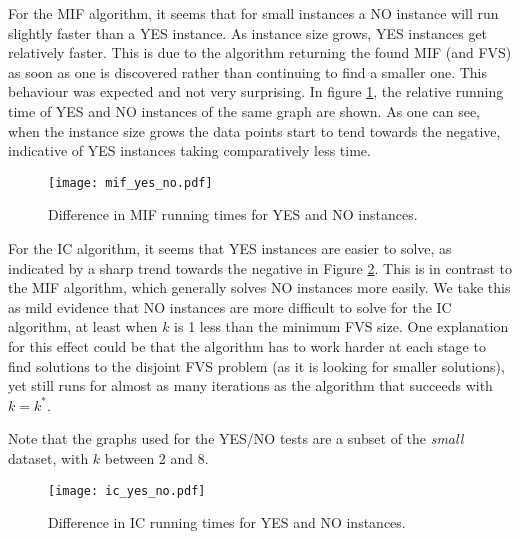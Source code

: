 \documentclass[a4paper,12pt]{article}
\begin{document}
For the MIF algorithm, it seems that for small instances a NO instance will run slightly faster than a YES instance. As instance size grows, YES instances get relatively faster. This is due to the algorithm returning the found MIF (and FVS) as soon as one is discovered rather than continuing to find a smaller one. This behaviour was expected and not very surprising. In figure \ref{fig:mif_yes_no}, the relative running time of YES and NO instances of the same graph are shown. As one can see, when the instance size grows the data points start to tend towards the negative, indicative of YES instances taking comparatively less time.

\begin{figure}[h]
\centering
\texttt{[image: mif\_yes\_no.pdf]}
\caption{Difference in MIF running times for YES and NO instances.}
\label{fig:mif_yes_no}
\end{figure}

For the IC algorithm, it seems that YES instances are easier to solve, as indicated by a sharp trend towards the negative in Figure \ref{fig:ic_yes_no}. This is in contrast to the MIF algorithm, which generally solves NO instances more easily. We take this as mild evidence that NO instances are more difficult to solve for the IC algorithm, at least when $k$ is 1 less than the minimum FVS size. One explanation for this effect could be that the algorithm has to work harder at each stage to find solutions to the disjoint FVS problem (as it is looking for smaller solutions), yet still runs for almost as many iterations as the algorithm that succeeds with $k = k^*$.

Note that the graphs used for the YES/NO tests are a subset of the \textit{small} dataset, with $k$ between 2 and 8.

\begin{figure}[h]
\centering
\texttt{[image: ic\_yes\_no.pdf]}
\caption{Difference in IC running times for YES and NO instances.}
\label{fig:ic_yes_no}
\end{figure}

\pagebreak


\end{document}

